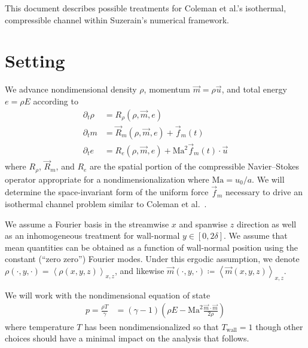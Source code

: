 \documentclass[letterpaper,11pt,nointlimits,reqno]{amsart}
\begin{document}
This document describes possible treatments for Coleman et al.'s isothermal,
compressible channel within Suzerain's numerical framework.

\section{Setting}

We advance nondimensional density $\rho$, momentum $\vec{m}=\rho{}\vec{u}$, and
total energy $e = \rho{}{E}$ according to
\begin{subequations}
\begin{align}
  \partial_{t} \rho{} &= R_{\rho}\!\left(\rho,\vec{m},e\right)
  \\
  \partial_{t} m      &= \vec{R}_{m}\!\left(\rho,\vec{m},e\right)
                       + \vec{f}_{m}(t)
  \\
  \partial_{t} e      &= R_{e}\!\left(\rho,\vec{m},e\right)
                       + \mbox{Ma}^{2} \vec{f}_{m}(t) \cdot \vec{u}
\end{align}
\end{subequations}
where $R_{\rho}$, $\vec{R}_{m}$, and $R_{e}$ are the spatial portion of the
compressible Navier--Stokes operator appropriate for a nondimensionalization
where $\mbox{Ma}=u_{0}/a$.  We will determine the space-invariant
form of the uniform force $\vec{f}_{m}$ necessary to drive an isothermal
channel problem similar to Coleman et al.~\cite{Coleman1995Numerical}.

We assume a Fourier basis in the streamwise $x$ and spanwise $z$ direction as
well as an inhomogeneous treatment for wall-normal
$y\in\left[0,2\delta\right]$.  We assume that mean quantities can be obtained
as a function of wall-normal position using the constant (``zero zero'')
Fourier modes.  Under this ergodic assumption, we denote
$\rho\!\left(\cdot,y,\cdot\right) = \left<\rho\left(x,y,z\right)\right>_{x,z}$,
and likewise $\vec{m}\!\left(\cdot,y,\cdot\right) \coloneqq
\left<\vec{m}\left(x,y,z\right)\right>_{x,z}$.

We will work with the
nondimensional equation of state
\begin{align}
  \label{eq:eos}
  p  = \frac{\rho{}T}{\gamma}
    &= \left(\gamma-1\right) \left(
          \rho{E} - \mbox{Ma}^2\frac{\vec{m}\cdot\vec{m}}{2\rho}
        \right)
\end{align}
where temperature $T$ has been nondimensionalized so that $T_\text{wall}=1$
though other choices should have a minimal impact on the analysis that follows.
\end{document}
